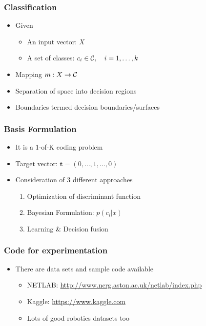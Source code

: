 \documentclass[10pt]{beamer}
\begin{document}
\begin{frame}
  \frametitle{Classification}
  \begin{itemize}
  \item Given 
    \begin{itemize}
    \item An input vector: $X$
    \item A set of classes: $c_i \in {\cal C}, \quad i=1, \ldots, k$
    \end{itemize}
  \item Mapping $m: X \rightarrow {\cal C}$
  \item Separation of space into decision regions
  \item Boundaries termed decision boundaries/surfaces
  \end{itemize}
\end{frame}

\begin{frame}
  \frametitle{Basis Formulation}
  \begin{itemize}
  \item It is a 1-of-K coding problem
  \item Target vector: ${\mathbf t} =\left( 0, \ldots, 1, \ldots, 0
    \right)$
  \item Consideration of 3 different approaches
    \begin{enumerate}
    \item Optimization of discriminant function
    \item Bayesian Formulation: $p(c_i | x)$
    \item Learning \& Decision fusion
    \end{enumerate}
  \end{itemize}
\end{frame}

\begin{frame}
  \frametitle{Code for experimentation}
  \begin{itemize}
  \item There are data sets and sample code available
    \begin{itemize}
    \item NETLAB: \url{http://www.ncrg.aston.ac.uk/netlab/index.php}
    \item Kaggle: \url{https://www.kaggle.com}
    \item Lots of good robotics datasets too
    \end{itemize}
  \end{itemize}
\end{frame}
\end{document}
